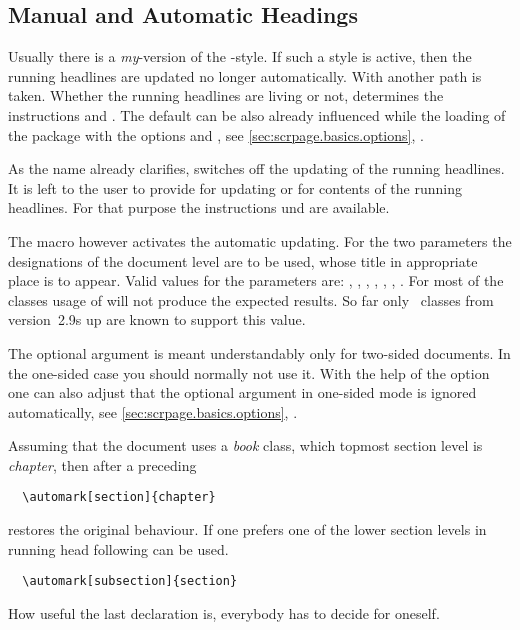 \subsection{Manual and Automatic Headings}
\label{sec:scrpage.basics.mark}
%
Usually there is a \emph{my}-version of the -style.  If such
a style is active, then the running headlines are updated no longer
automatically.  With  another path is taken. Whether the
running headlines are living or not, determines the instructions
 and .  The default can be also already
influenced while the loading of the package with the options 
and , see \autoref{sec:scrpage.basics.options},
.

\begin{Declaration}
\end{Declaration}%
As the name already clarifies,  switches off the updating
of the running headlines. It is left to the user to provide for
updating or for contents of the running headlines.
For that purpose the instructions 
und  are available.

\begin{Declaration}
\end{Declaration}%
The macro  however activates the automatic updating.
For the two parameters the designations of the document level
are to be used, whose title in appropriate place is to appear.
Valid values for the parameters are:
, ,
, , ,
, .
For most of the classes usage of  will not produce
the expected results. So far only \KOMAScript\ classes from version~2.9s
up are known to support this value.

The optional argument  is meant understandably only for
two-sided documents.
In the one-sided case you should normally not use it.
With the help of the option  one can also adjust
that the optional argument in one-sided mode is ignored automatically,
see \autoref{sec:scrpage.basics.options},
.
%
\begin{Example}
Assuming that the document uses a \emph{book} class,
which topmost section level is \emph{chapter},
then after a preceding 
\begin{lstlisting}
  \automark[section]{chapter}
\end{lstlisting}
restores the original behaviour.
If one prefers one of the lower section levels in running head
following can be used.
\begin{lstlisting}
  \automark[subsection]{section}
\end{lstlisting}
How useful the last declaration is, everybody has to decide
for oneself.
\end{Example}

